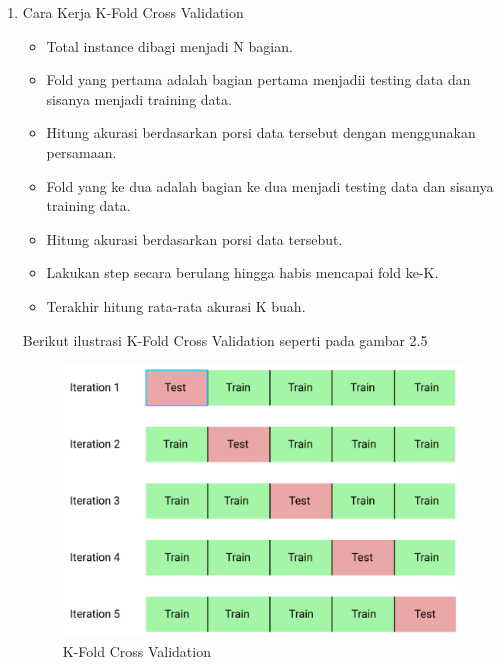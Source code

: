 \begin{enumerate}
\item Cara Kerja K-Fold Cross Validation
	\begin{itemize}
		\item Total instance dibagi menjadi N bagian.
		\item Fold yang pertama adalah bagian pertama menjadii testing data dan sisanya menjadi training data.
		\item Hitung akurasi berdasarkan porsi data tersebut dengan menggunakan persamaan.
		\item Fold yang ke dua adalah bagian ke dua menjadi testing data dan sisanya training data. 
		\item Hitung akurasi berdasarkan porsi data tersebut.
		\item Lakukan step secara berulang hingga habis mencapai fold ke-K.
		\item Terakhir hitung rata-rata akurasi K buah.
	\end{itemize}
\par
Berikut ilustrasi K-Fold Cross Validation seperti pada gambar 2.5
\begin{figure}[ht]
\centering
\includegraphics[scale=0.9]{figures/zulfikar/5.png}
\caption{K-Fold Cross Validation}
\end{figure}


\end{enumerate}
